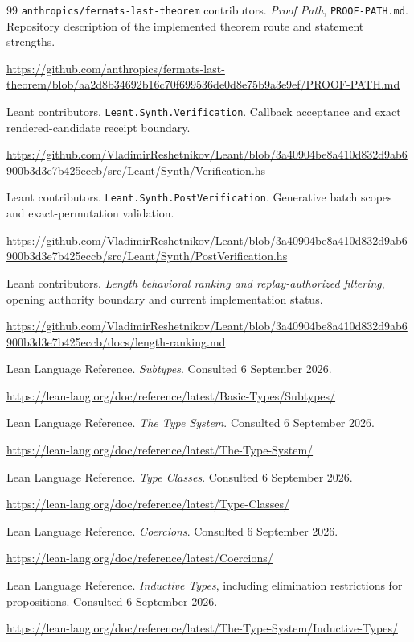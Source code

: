 \documentclass[11pt,letterpaper]{article}
\newcommand{\code}[1]{\nolinkurl{#1}}
\theoremstyle{remark}
\begin{document}
\begin{thebibliography}{99}
\code{anthropics/fermats-last-theorem} contributors.
\emph{Proof Path}, \code{PROOF-PATH.md}. Repository description of the
implemented theorem route and statement strengths.\par
\url{https://github.com/anthropics/fermats-last-theorem/blob/aa2d8b34692b16c70f699536de0d8e75b9a3e9ef/PROOF-PATH.md}

Leant contributors. \code{Leant.Synth.Verification}.
Callback acceptance and exact rendered-candidate receipt boundary.\par
\url{https://github.com/VladimirReshetnikov/Leant/blob/3a40904be8a410d832d9ab6900b3d3e7b425eccb/src/Leant/Synth/Verification.hs}

Leant contributors. \code{Leant.Synth.PostVerification}.
Generative batch scopes and exact-permutation validation.\par
\url{https://github.com/VladimirReshetnikov/Leant/blob/3a40904be8a410d832d9ab6900b3d3e7b425eccb/src/Leant/Synth/PostVerification.hs}

Leant contributors. \emph{Length behavioral ranking and replay-authorized
filtering}, opening authority boundary and current implementation status.\par
\url{https://github.com/VladimirReshetnikov/Leant/blob/3a40904be8a410d832d9ab6900b3d3e7b425eccb/docs/length-ranking.md}

Lean Language Reference. \emph{Subtypes}. Consulted 6 September 2026.\par
\url{https://lean-lang.org/doc/reference/latest/Basic-Types/Subtypes/}

Lean Language Reference. \emph{The Type System}. Consulted 6 September 2026.\par
\url{https://lean-lang.org/doc/reference/latest/The-Type-System/}

Lean Language Reference. \emph{Type Classes}. Consulted 6 September 2026.\par
\url{https://lean-lang.org/doc/reference/latest/Type-Classes/}

Lean Language Reference. \emph{Coercions}. Consulted 6 September 2026.\par
\url{https://lean-lang.org/doc/reference/latest/Coercions/}

Lean Language Reference. \emph{Inductive Types}, including elimination
restrictions for propositions. Consulted 6 September 2026.\par
\url{https://lean-lang.org/doc/reference/latest/The-Type-System/Inductive-Types/}


\end{thebibliography}
\end{document}
